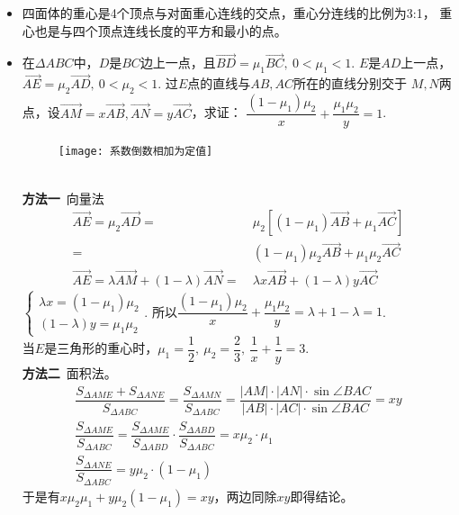 \begin{itemize}[leftmargin=\inteval{\myitemleftmargin}pt,itemsep=
   \inteval{\myitemitempsep}pt,topsep=\inteval{\myitemtopsep}pt]
\item 四面体的重心是4个顶点与对面重心连线的交点，重心分连线的比例为3:1，
重心也是与四个顶点连线长度的平方和最小的点。

\item 在$ \Delta ABC $中，$ D $是$ BC $边上一点，且$ \vec{BD}=\mu_1
\vec{BC},\ 0<\mu_1<1 $. $ E $是$ AD $上一点，$ \vec{AE} =
\mu_2\vec{AD},\ 0<\mu_2<1 $. 过$ E $点的直线与$ AB,AC $所在的直线分别交于
$ M,N $两点，设$ \vec{AM}=x\vec{AB},\vec{AN}=
y\vec{AC} $，求证：
$ \dfrac{(1-\mu_1)\mu_2}{x}+\dfrac{\mu_1\mu_2}{y}=1 $. 
\begin{figure}[h]
    \centering
    \texttt{[image: 系数倒数相加为定值]}
\end{figure} \\
\textbf{方法一}\ 向量法
\begin{align*}
    \vec{AE} =\mu_2\vec{AD} =&\ \mu_2\left[
    (1-\mu_1)\vec{AB}+\mu_1\vec{AC}\right]\\
    =&\ (1-\mu_1)\mu_2\vec{AB}+\mu_1\mu_2\vec{AC} \\
    \vec{AE}=\lambda\vec{AM}+(1-\lambda)
    \vec{AN}=&\ \lambda x\vec{AB}+(1-\lambda)y
    \vec{AC}
\end{align*}
$ \begin{cases}
    \lambda x = (1-\mu_1)\mu_2 \\
    (1-\lambda)y = \mu_1\mu_2
\end{cases} $. 所以$ \dfrac{(1-\mu_1)\mu_2}{x}+\dfrac{\mu_1\mu_2}{y}
=\lambda+1-\lambda=1 $. \\
当$ E $是三角形的重心时，$ \mu_1=\dfrac{1}{2},\ \mu_2=\dfrac{2}{3},\ 
\dfrac{1}{x}+\dfrac{1}{y}=3 $. \\
\textbf{方法二}\ 面积法。
\begin{gather*}
    \dfrac{S_{\Delta AME}+S_{\Delta ANE}}{S_{\Delta ABC}}=
    \dfrac{S_{\Delta AMN}}{S_{\Delta ABC}}=\dfrac{|AM|\cdot 
    |AN|\cdot\sin\angle BAC}
    {|AB|\cdot |AC|\cdot\sin\angle BAC}=xy \\
    \dfrac{S_{\Delta AME}}{S_{\Delta ABC}}=\dfrac{S_{\Delta AME}}
    {S_{\Delta ABD}}\cdot \dfrac{S_{\Delta ABD}}{S_{\Delta ABC}}=x\mu_2\cdot\mu_1 \\
    \dfrac{S_{\Delta ANE}}{S_{\Delta ABC}}=y\mu_2\cdot(1-\mu_1)
\end{gather*}
于是有$ x\mu_2\mu_1+y\mu_2(1-\mu_1)=xy $，两边同除$ xy $即得结论。


\end{itemize}
